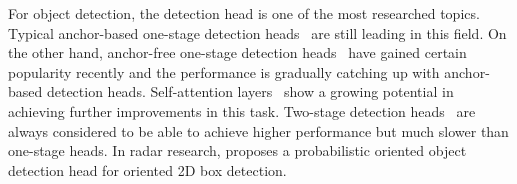 \documentclass[10pt, conference, compsocconf]{IEEEtran}
\begin{document}
For object detection, the detection head is one of the most researched topics. Typical anchor-based one-stage detection heads~\cite{Ref:SSD, Ref:YOLOv4, Ref:FocalLoss} are still leading in this field. 
On the other hand, anchor-free one-stage detection heads~\cite{Ref:FCOS} have gained certain popularity recently and the performance is gradually catching up with anchor-based detection heads. Self-attention layers~\cite{Ref:SAGAN, Ref:SAUnet} show a growing potential in achieving further improvements in this task. Two-stage detection heads~\cite{Ref:FasterRCNN} are always considered to be able to achieve higher performance but much slower than one-stage heads. In radar research, \cite{Ref:ProbabilisticOriented} proposes a probabilistic oriented object detection head for oriented 2D box detection.

%
%	
%	
%	
\end{document}

